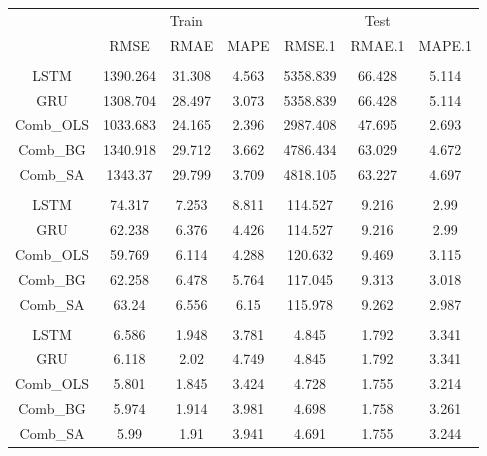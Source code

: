 \documentclass[
]{article}
\begin{document}
\begin{tabular}[t]{ccccccc}
\toprule
\multicolumn{1}{c}{ } & \multicolumn{3}{c}{Train} & \multicolumn{3}{c}{Test} \\
\cmidrule(l{3pt}r{3pt}){2-4} \cmidrule(l{3pt}r{3pt}){5-7}
 & RMSE & RMAE & MAPE & RMSE.1 & RMAE.1 & MAPE.1\\
\midrule
\addlinespace[0.3em]
\multicolumn{7}{l}{\textbf{BTC}}\\
\hspace{1em}LSTM & 1390.264 & 31.308 & 4.563 & 5358.839 & 66.428 & 5.114\\
\hspace{1em}GRU & 1308.704 & 28.497 & 3.073 & 5358.839 & 66.428 & 5.114\\
\hspace{1em}Comb\_OLS & 1033.683 & 24.165 & 2.396 & 2987.408 & 47.695 & 2.693\\
\hspace{1em}Comb\_BG & 1340.918 & 29.712 & 3.662 & 4786.434 & 63.029 & 4.672\\
\hspace{1em}Comb\_SA & 1343.37 & 29.799 & 3.709 & 4818.105 & 63.227 & 4.697\\
\addlinespace[0.3em]
\multicolumn{7}{l}{\textbf{ETH}}\\
\hspace{1em}LSTM & 74.317 & 7.253 & 8.811 & 114.527 & 9.216 & 2.99\\
\hspace{1em}GRU & 62.238 & 6.376 & 4.426 & 114.527 & 9.216 & 2.99\\
\hspace{1em}Comb\_OLS & 59.769 & 6.114 & 4.288 & 120.632 & 9.469 & 3.115\\
\hspace{1em}Comb\_BG & 62.258 & 6.478 & 5.764 & 117.045 & 9.313 & 3.018\\
\hspace{1em}Comb\_SA & 63.24 & 6.556 & 6.15 & 115.978 & 9.262 & 2.987\\
\addlinespace[0.3em]
\multicolumn{7}{l}{\textbf{LTC}}\\
\hspace{1em}LSTM & 6.586 & 1.948 & 3.781 & 4.845 & 1.792 & 3.341\\
\hspace{1em}GRU & 6.118 & 2.02 & 4.749 & 4.845 & 1.792 & 3.341\\
\hspace{1em}Comb\_OLS & 5.801 & 1.845 & 3.424 & 4.728 & 1.755 & 3.214\\
\hspace{1em}Comb\_BG & 5.974 & 1.914 & 3.981 & 4.698 & 1.758 & 3.261\\
\hspace{1em}Comb\_SA & 5.99 & 1.91 & 3.941 & 4.691 & 1.755 & 3.244\\
\bottomrule
\end{tabular}
\end{document}
